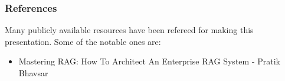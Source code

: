 \begin{frame}\frametitle{References}
Many publicly available resources have been refereed for making this presentation. Some of the notable ones are:
\footnotesize
\begin{itemize}
\item Mastering RAG: How To Architect An Enterprise RAG System - Pratik Bhavsar
\end{itemize}

\end{frame}
